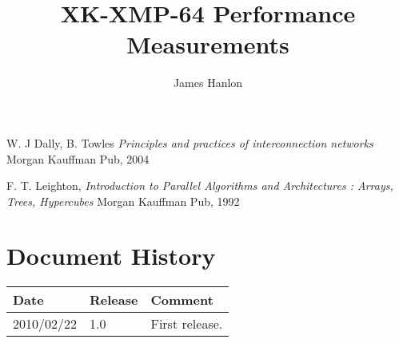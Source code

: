 \documentclass{xmos}
\begin{document}
\title{XK-XMP-64 Performance Measurements}
\author{James Hanlon}

\maketitle






\begin{thebibliography}{9}

    W. J Dally, B. Towles
    \emph{Principles and practices of interconnection networks}
    Morgan Kauffman Pub, 2004

    F. T. Leighton,
    \emph{Introduction to Parallel Algorithms and Architectures : Arrays, Trees, Hypercubes}
    Morgan Kauffman Pub, 1992

\end{thebibliography}

\section{Document History}

\begin{small}
\renewcommand{\arraystretch}{1.25}
\begin{tabular}{| p{20mm} | p{12mm} | p{88mm}|}
\hline
\textbf{Date} & \textbf{Release} & \textbf{Comment} \\
\hline
2010/02/22 & 1.0 & First release. \\
 \hline
\end{tabular}
\end{small}
\end{document}
